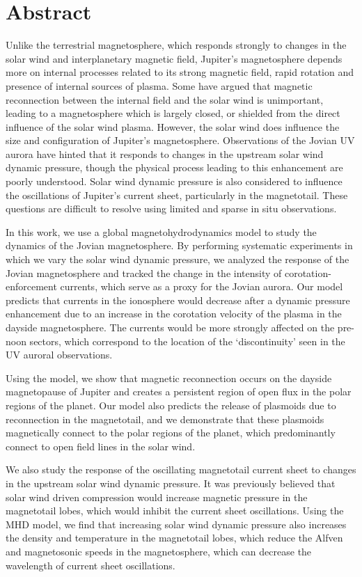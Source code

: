 \chapter{Abstract}

Unlike the terrestrial magnetosphere, which responds strongly to changes in the solar wind and interplanetary magnetic field, Jupiter's magnetosphere depends more on internal processes related to its strong magnetic field, rapid rotation and presence of internal sources of plasma. Some have argued that magnetic reconnection between the internal field and the solar wind is unimportant, leading to a magnetosphere which is largely closed, or shielded from the direct influence of the solar wind plasma. However, the solar wind does influence the size and configuration of Jupiter's magnetosphere. Observations of the Jovian UV aurora have hinted that it responds to changes in the upstream solar wind dynamic pressure, though the physical process leading to this enhancement are poorly understood. Solar wind dynamic pressure is also considered to influence the oscillations of Jupiter's current sheet, particularly in the magnetotail. These questions are difficult to resolve using limited and sparse in situ observations. 

In this work, we use a global magnetohydrodynamics model to study the dynamics of the Jovian magnetosphere. By performing systematic experiments in which we vary the solar wind dynamic pressure, we analyzed the response of the Jovian magnetosphere and tracked the change in the intensity of corotation-enforcement currents, which serve as a proxy for the Jovian aurora. Our model predicts that currents in the ionosphere would decrease after a dynamic pressure enhancement due to an increase in the corotation velocity of the plasma in the dayside magnetosphere. The currents would be more strongly affected on the pre-noon sectors, which correspond to the location of the ‘discontinuity’ seen in the UV auroral observations. 

Using the model, we show that magnetic reconnection occurs on the dayside magnetopause of Jupiter and creates a persistent region of open flux in the polar regions of the planet. Our model also predicts the release of plasmoids due to reconnection in the magnetotail, and we demonstrate that these plasmoids magnetically connect to the polar regions of the planet, which predominantly connect to open field lines in the solar wind. 

We also study the response of the oscillating magnetotail current sheet to changes in the upstream solar wind dynamic pressure. It was previously believed that solar wind driven compression would increase magnetic pressure in the magnetotail lobes, which would inhibit the current sheet oscillations. Using the MHD model, we find that increasing solar wind dynamic pressure also increases the density and temperature in the magnetotail lobes, which reduce the Alfven and magnetosonic speeds in the magnetosphere, which can decrease the wavelength of current sheet oscillations. 


